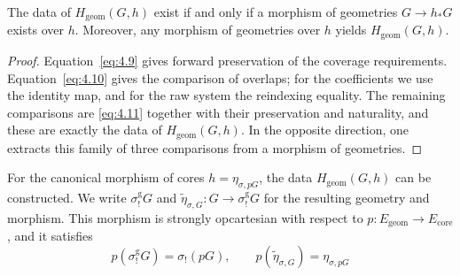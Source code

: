 \begin{proposition}\label{prop:4.10}

The data of $H_{\mathrm{geom}}(G,h)$ exist if and only if a morphism of geometries
$G\to h_*G$ exists over $h$.
Moreover, any morphism of geometries over $h$ yields $H_{\mathrm{geom}}(G,h)$.

\end{proposition}

\begin{proof}

Equation~\eqref{eq:4.9} gives forward preservation of the coverage requirements.
Equation~\eqref{eq:4.10} gives the comparison of overlaps; for the coefficients we use the
identity map, and for the raw system the reindexing equality.
The remaining comparisons are \eqref{eq:4.11} together with their preservation and
naturality, and these are exactly the data of $H_{\mathrm{geom}}(G,h)$.
In the opposite direction, one extracts this family of three comparisons from a morphism
of geometries.

\end{proof}

\begin{theorem}\label{thm:4.11}

For the canonical morphism of cores $h=\eta_{\sigma,pG}$, the data
$H_{\mathrm{geom}}(G,h)$ can be constructed.
We write
$\sigma_!^{\mathrm g}G$ and $\widetilde\eta_{\sigma,G}:G\to\sigma_!^{\mathrm g}G$
for the resulting geometry and morphism. This morphism is strongly opcartesian with
respect to $p:E_{\mathrm{geom}}\to E_{\mathrm{core}}$, and it satisfies
\begin{equation*}
p(\sigma_!^{\mathrm g}G)=\sigma_!(pG),\qquad
p(\widetilde\eta_{\sigma,G})=\eta_{\sigma,pG}
\tag{4.12}\label{eq:4.12}
\end{equation*}
\end{theorem}

